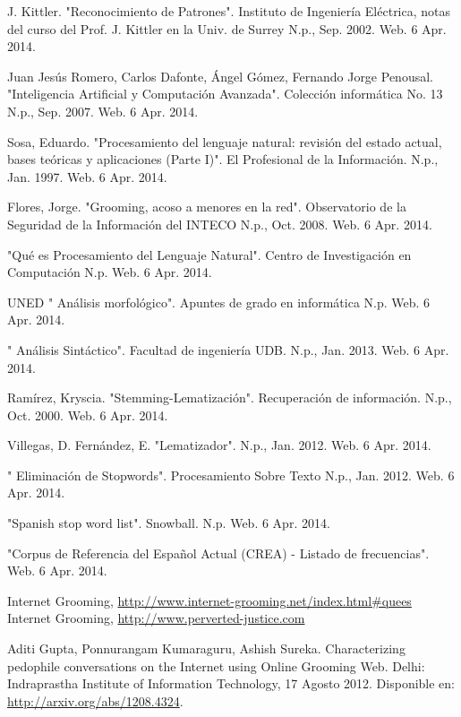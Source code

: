 
\begin{thebibliography}{99}


 J. Kittler. "Reconocimiento de Patrones". Instituto de Ingenier\'ia El\'ectrica, notas del curso del Prof. J. Kittler en la Univ. de Surrey N.p., Sep. 2002. Web. 6 Apr. 2014. 

 Juan Jes\'us Romero, Carlos Dafonte, \'Angel G\'omez, Fernando Jorge Penousal. "Inteligencia Artificial y Computaci\'on Avanzada". Colecci\'on inform\'atica No. 13 N.p., Sep. 2007. Web. 6 Apr. 2014. 

 Sosa, Eduardo. "Procesamiento del lenguaje natural: revisi\'on del estado actual, bases te\'oricas y aplicaciones (Parte I)". El Profesional de la Informaci\'on. N.p., Jan. 1997. Web. 6 Apr. 2014. 


 Flores, Jorge. "Grooming, acoso a menores en la red". Observatorio de la Seguridad de la Informaci\'on del INTECO N.p., Oct. 2008. Web. 6 Apr. 2014. 

 "Qu\'e es Procesamiento del Lenguaje Natural". Centro de Investigaci\'on en Computaci\'on N.p. Web. 6 Apr. 2014. 

 UNED " An\'alisis morfol\'ogico". Apuntes de grado en inform\'atica N.p. Web. 6 Apr. 2014. 


  " An\'alisis Sint\'actico". Facultad de ingenier\'ia UDB. N.p., Jan. 2013. Web. 6 Apr. 2014. 

 Ram\'irez, Kryscia. "Stemming-Lematizaci\'on". Recuperaci\'on de informaci\'on. N.p., Oct. 2000. Web. 6 Apr. 2014. 

 Villegas, D. Fern\'andez, E. "Lematizador".  N.p., Jan. 2012. Web. 6 Apr. 2014. 

  " Eliminaci\'on de Stopwords". Procesamiento Sobre Texto  N.p., Jan. 2012. Web. 6 Apr. 2014. 

 "Spanish stop word list". Snowball. N.p. Web. 6 Apr. 2014. 

 "Corpus de Referencia del Espa\~nol Actual (CREA) - Listado de frecuencias". Web. 6 Apr. 2014. 

 Internet Grooming, \url{http://www.internet-grooming.net/index.html#quees}
 Internet Grooming, \url{http://www.perverted-justice.com}

 Aditi Gupta, Ponnurangam Kumaraguru, Ashish Sureka. Characterizing pedophile conversations on the Internet using Online Grooming Web. Delhi: Indraprastha Institute of Information Technology, 17 Agosto 2012. Disponible en: \url{http://arxiv.org/abs/1208.4324}.


\end{thebibliography}
